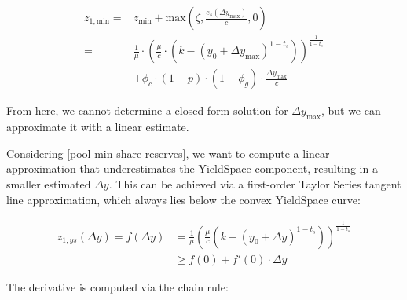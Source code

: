 \begin{equation}\label{pool-min-share-reserves}
\begin{aligned}
    z_{1,\text{min}} = &z_{\text{min}} + \text{max}\left( \zeta, \tfrac{e_s(\Delta y_{\text{max}})}{c}, 0 \right) \\
    = &\tfrac{1}{\mu} \cdot \left(
    \tfrac{\mu}{c} \cdot \left( k - (y_0 + \Delta y_{\text{max}})^{1 - t_s} \right)
    \right)^{\tfrac{1}{1 - t_s}} \\
    &+ \phi_c \cdot (1 - p) \cdot (1 - \phi_g) \cdot \tfrac{\Delta y_{\text{max}}}{c}
\end{aligned}
\end{equation}


From here, we cannot determine a closed-form solution for $\Delta y_{\text{max}}$, but we can approximate it with a linear estimate.


Considering \eqref{pool-min-share-reserves}, we want to compute a linear approximation that underestimates the YieldSpace component, resulting in a smaller estimated $\Delta y$.
This can be achieved via a first-order Taylor Series tangent line approximation, which always lies below the convex YieldSpace curve:

\begin{equation}
\begin{aligned}
    z_{1,ys}(\Delta y) = f(\Delta y) &= \frac{1}{\mu} \left( \frac{\mu}{c} \left( k - \left( y_0 + \Delta y \right)^{1 - t_s} \right)\right)^{\frac{1}{1 - t_s}} \\
    &\ge f(0) + f'(0) \cdot \Delta y
\end{aligned}
\end{equation}

The derivative is computed via the chain rule:

